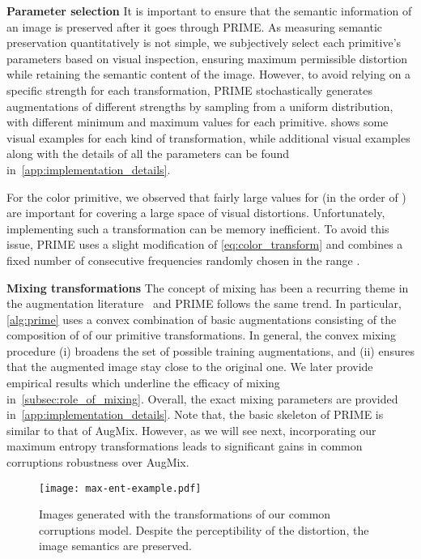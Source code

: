 \documentclass[runningheads]{llncs}
\begin{document}
\smallskip\noindent\textbf{Parameter selection}
It is important to ensure that the semantic information of an image is preserved after it goes through PRIME. As measuring semantic preservation quantitatively is not simple, we subjectively select each primitive's parameters based on visual inspection, ensuring maximum permissible distortion while retaining the semantic content of the image. However, to avoid relying on a specific strength for each transformation, PRIME stochastically generates augmentations of different strengths by sampling  from a uniform distribution, with different minimum and maximum values for each primitive.  shows some visual examples for each kind of transformation, while additional visual examples along with the details of all the parameters can be found in~\cref{app:implementation_details}. 

For the color primitive, we observed that fairly large values for  (in the order of ) are important for covering a large space of visual distortions. Unfortunately, implementing such a transformation can be memory inefficient. To avoid this issue, PRIME uses a slight modification of \cref{eq:color_transform} and combines a fixed number  of consecutive frequencies randomly chosen in the range . 


\smallskip\noindent\textbf{Mixing transformations}
The concept of mixing has been a recurring theme in the augmentation literature~\cite{mixup2018,cutmix2019,augmix2020,augmax2021} and PRIME follows the same trend. In particular, \cref{alg:prime} uses a convex combination of  basic augmentations consisting of the composition of  of our primitive transformations. In general, the convex mixing procedure (i) broadens the set of possible training augmentations, and (ii) ensures that the augmented image stay close to the original one. We later provide empirical results which underline the efficacy of mixing in~\cref{subsec:role_of_mixing}. Overall, the exact mixing parameters are provided in~\cref{app:implementation_details}. Note that, the basic skeleton of PRIME is similar to that of AugMix. However, as we will see next, incorporating our maximum entropy transformations leads to significant gains in common corruptions robustness over AugMix. 



\begin{figure}[t]
    \centering
    \texttt{[image: max-ent-example.pdf]}
    \caption{Images generated with the transformations of our common corruptions model. Despite the perceptibility of the distortion, the image semantics are preserved.}
    \vspace*{-2mm}
    \label{fig:visual_inspection}
\end{figure}
\end{document}
